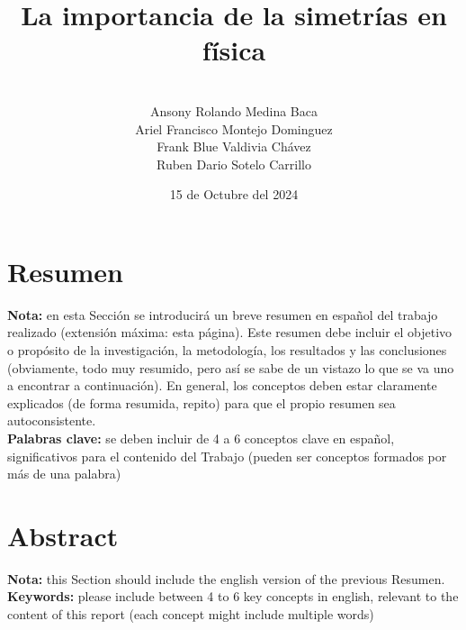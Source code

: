 \documentclass[11pt,a4paper,spanish]{book}
\title{La importancia de la simetrías en física}
\author{
        \\
        \hspace{3cm}Ansony Rolando Medina Baca\\
        \hspace{3cm}Ariel Francisco Montejo Dominguez\\
       \hspace{3cm}Frank Blue Valdivia Chávez\\
      \hspace{3cm}Ruben Dario Sotelo Carrillo
        }
\date{15 de Octubre del 2024}
\begin{document}
\renewcommand{\listfigurename}{Índice de figuras}
\renewcommand{\listtablename}{Índice de tablas}
\renewcommand{\contentsname}{Índice de contenidos}
\renewcommand{\figurename}{Figura}
\renewcommand{\tablename}{Tabla} 

\maketitle

\frontmatter
\tableofcontents
\listoffigures
\listoftables

\chapter{Resumen}
{\bf Nota:} en esta Sección se introducirá un breve resumen en español del trabajo realizado (extensión máxima: esta página). Este resumen debe incluir el objetivo o propósito de la investigación, la metodología, los resultados y las conclusiones (obviamente, todo muy resumido, pero así se sabe de un vistazo lo que se va uno a encontrar a continuación). En general, los conceptos deben estar claramente explicados (de forma resumida, repito) para que el propio resumen sea autoconsistente.\\


{\bf Palabras clave:} se deben incluir de 4 a 6 conceptos clave en español, significativos para el contenido del Trabajo (pueden ser conceptos formados por más de una palabra)

\chapter{Abstract}
{\bf Nota:} this Section should include the english version of the previous Resumen.\\


{\bf Keywords:} please include between 4 to 6 key concepts in english, relevant to the content of this report (each concept might include multiple words)

\mainmatter
\end{document}
